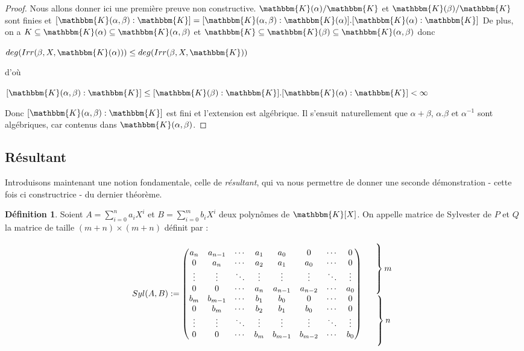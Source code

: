 \documentclass[12pt]{article}
\newcommand{\K}{\mathbbm{K}}
\theoremstyle{definition}\newtheorem{defn}{Définition}
\theoremstyle{definition}\newtheorem{exm}{Exemple}
\theoremstyle{definition}\newtheorem{rem}{Remarque}
\theoremstyle{definition}\newtheorem{algo}{Algorithme}
\theoremstyle{remark}\newtheorem{exo}{Exercice}
\theoremstyle{remark}\newtheorem{nota}{Notation}
\begin{document}
\begin{proof}
Nous allons donner ici une première preuve non constructive. $\K(\alpha)/\K$ et $\K(\beta)/\K$ sont finies et $[\K(\alpha, \beta) : \K] = [\K(\alpha, \beta) : \K(\alpha)].[\K(\alpha) : \K]$ \newline
De plus, on a $K\subseteq \K(\alpha) \subseteq \K(\alpha,\beta)$ et $ \K\subseteq \K(\beta) \subseteq \K(\alpha,\beta)$ donc 
\begin{center}
$deg(Irr(\beta,X,\K(\alpha))) \le deg(Irr(\beta,X,\K))$
\end{center}
d'où 
\begin{center}
$[\K(\alpha,\beta) : \K] \le [\K(\beta) : \K].[\K(\alpha) : \K] < \infty$
\end{center}
Donc  $[\K(\alpha, \beta) : \K]$ est fini et l'extension est algébrique. Il s'ensuit naturellement que $\alpha + \beta$, $\alpha.\beta$ et $\alpha^{-1}$ sont algébriques, car contenus dans $\K(\alpha, \beta)$.
\end{proof}


\subsection{Résultant}

Introduisons maintenant une notion fondamentale, celle de \textit{résultant}, qui va nous permettre de donner une seconde démonstration - cette fois ci constructrice - du dernier théorème.

\begin{defn}
Soient $A = \displaystyle\sum_{i=0}^n a_iX^i$ et $B = \displaystyle\sum_{i=0}^m b_iX^i$ deux polynômes de $\K[X]$. On appelle matrice de Sylvester de $P$ et $Q$ la matrice de taille $(m+n)\times(m+n)$ définit par :
\begin{center}
$$\begin{array}{cc} 
Syl(A,B) :=
   \begin{pmatrix} 
a_n & a_{n-1} & \cdots & a_1 & a_0 & 0 & \cdots & 0 \\
0 & a_n & \cdots & a_2 & a_1	 & a_0 & \cdots & 0 \\
\vdots & \vdots & \ddots & \vdots & \vdots & \vdots & \ddots & \vdots\\
0 & 0 & \cdots & a_n & a_{n-1} & a_{n-2} & \cdots & a_0 \\
b_m & b_{m-1} & \cdots & b_1 & b_0 & 0 & \cdots & 0 \\
0 & b_m & \cdots & b_2 & b_1	 & b_0 & \cdots & 0 \\
\vdots & \vdots & \ddots & \vdots & \vdots & \vdots & \ddots & \vdots\\
0 & 0 & \cdots & b_m & b_{m-1} & b_{m-2} & \cdots & b_0 \\
   \end{pmatrix} 
&  \begin{array}{c} 
      \left. \rule{0pt}{12mm} \right\} m \\
      \left. \rule{0pt}{12mm} \right\} n 
   \end{array} 
\end{array}$$
\end{center}
\end{defn}
\end{document}
